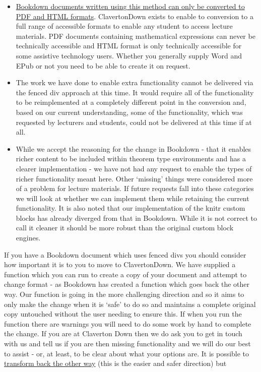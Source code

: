 \documentclass[
  12pt,
  a4paper]{extarticle}
\providecommand{\tightlist}{%
  \setlength{\itemsep}{0pt}\setlength{\parskip}{0pt}}
\theoremstyle{plain}
\theoremstyle{definition}
\theoremstyle{plain}
\theoremstyle{plain}
\theoremstyle{plain}
\theoremstyle{plain}
\theoremstyle{definition}
\theoremstyle{definition}
\theoremstyle{remark}
\theoremstyle{remark}
\renewcommand{\;}{\,}
\begin{document}
\begin{itemize}
\tightlist
\item
  \href{https://bookdown.org/yihui/bookdown/markdown-extensions-by-bookdown.html\#theorem-engine}{Bookdown documents written using this method can only be converted to PDF and HTML formats}. ClavertonDown exists to enable to conversion to a full range of accessible formats to enable any student to access lecture materials. PDF documents containing mathematical expressions can never be technically accessible and HTML format is only technically accessible for some assistive technology users. Whether you generally supply Word and EPub or not you need to be able to create it on request.
\item
  The work we have done to enable extra functionality cannot be delivered via the fenced div approach at this time. It would require all of the functionality to be reimplemented at a completely different point in the conversion and, based on our current understanding, some of the functionality, which was requested by lecturers and students, could not be delivered at this time if at all.
\item
  While we accept the reasoning for the change in Bookdown - that it enables richer content to be included within theorem type environments and has a clearer implementation - we have not had any request to enable the types of richer functionality meant here. Other `missing' things were considered more of a problem for lecture materials. If future requests fall into these categories we will look at whether we can implement them while retaining the current functionality. It is also noted that our implementation of the knitr custom blocks has already diverged from that in Bookdown. While it is not correct to call it cleaner it should be more robust than the original custom block engines.
\end{itemize}

If you have a Bookdown document which uses fenced divs you should consider how important it is to you to move to ClavertonDown. We have supplied a function which you can run to create a copy of your document and attempt to change format - as Bookdown has created a function which goes back the other way. Our function is going in the more challenging direction and so it aims to only make the change when it is `safe' to do so and maintains a complete original copy untouched without the user needing to ensure this. If when you run the function there are warnings you will need to do some work by hand to complete the change. If you are at Claverton Down then we do ask you to get in touch with us and tell us if you are then missing functionality and we will do our best to assist - or, at least, to be clear about what your options are. It is possible to \href{https://bookdown.org/yihui/bookdown/markdown-extensions-by-bookdown.html\#theorem-engine}{transform back the other way} (this is the easier and safer direction) but
\end{document}
